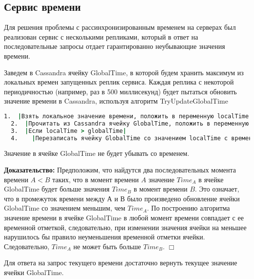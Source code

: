 \subsection{Сервис времени}

Для решения проблемы с рассинхронизированным временем на серверах был реализован сервис с несколькими репликами, который в ответ на последовательные запросы отдает гарантированно неубывающие значения времени.

Заведем в Cassandra ячейку GlobalTime, в которой будем хранить максимум из локальных времен запущенных реплик сервиса. Каждая реплика с некоторой периодичностью (например, раз в 500 миллисекунд) будет пытаться обновить значение времени в Cassandra, используя алгоритм TryUpdateGlobalTime

\begin{lstlisting}[language=csh,caption={Алгоритм TryUpdateGlobalTime}]
  1.  |Взять локальное значение времени, положить в переменную localTime|
  2.  |Прочитать из Cassandra ячейку GlobalTime, положить в переменную globalTime|
  3.  |Если localTime > globalTime|
  4.  	|Перезаписать ячейку GlobalTime со значением localTime с временной отметкой localTime|
\end{lstlisting}

\begin{theorem}
Значение в ячейке GlobalTime не будет убывать со временем.
\end{theorem}
\textbf{Доказательство:}
Предположим, что найдутся два последовательных момента времени $A < B$ таких, что в момент времени $A$ значение $Time_A$ в ячейке GlobalTime будет больше значения $Time_B$ в момент времени $B$. Это означает, что в промежуток времени между $А$ и $В$ было произведено обновление ячейки GlobalTime со значением меньшим, чем $Time_A$. По построению алгоритма значение времени в ячейке GlobalTime в любой момент времени совпадает с ее временной отметкой, следовательно, при изменении значения ячейки на меньшее нарушилось бы правило неуменьшения временной отметки ячейки. Следовательно, $Time_A$ не может быть больше $Time_B$.
$\Box$

Для ответа на запрос текущего времени достаточно вернуть текущее значение ячейки GlobalTime.
